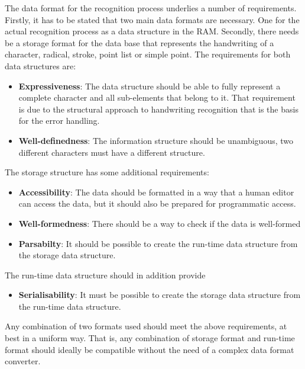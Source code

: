 The data format for the recognition process underlies a number of requirements.
Firstly, it has to be stated that two main data formats are necessary. 
One for the actual recognition process as a data structure in the RAM.
Secondly, there needs be a storage format for the data base that represents
the handwriting of a character, radical, stroke, point list or simple point.
The requirements for both data structures are:
\begin{itemize}
  \item \textbf{Expressiveness}: The data structure should be able to 
        fully represent a complete character and all sub-elements that belong 
        to it. That requirement is due to the structural approach to handwriting
        recognition that is the basis for the error handling.

  \item \textbf{Well-definedness}: The information structure should be 
        unambiguous, two different characters must have a different structure.
\end{itemize}
The storage structure has some additional requirements:
\begin{itemize}
  \item \textbf{Accessibility}: The data should be formatted in a way that a 
        human editor can access the data, but it should also be prepared for 
        programmatic access.
  \item \textbf{Well-formedness}: There should be a way to check if the data is 
        well-formed
  \item \textbf{Parsabilty}: It should be possible to create the run-time data 
        structure from the storage data structure.
\end{itemize}
The run-time data structure should in addition provide
\begin{itemize}
  \item \textbf{Serialisability}: It must be possible to create the storage 
        data structure from the run-time data structure.
\end{itemize}
Any combination of two formats used should meet the above requirements, 
at best in a uniform way. That is, any combination of storage format and 
run-time format should ideally be compatible without the need of a complex
data format converter.




